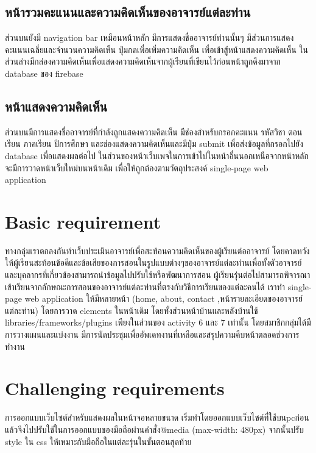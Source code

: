 \documentclass[17pt]{extarticle}
\begin{document}
\subsection{หน้ารวมคะแนนและความคิดเห็นของอาจารย์แต่ละท่าน}

ส่วนบนยังมี navigation bar เหมือนหน้าหลัก มีการแสดงชื่ออาจารย์ท่านนั้นๆ มีส่วนการแสดงคะแนนเฉลี่ยและจำนวนความคิดเห็น ปุ่มกดเพื่อเพิ่มความคิดเห็น เพื่อเข้าสู้หน้าแสดงความคิดเห็น ในส่วนล่างมีกล่องความคิดเห็นเพื่อแสดงความคิดเห็นจากผู้เรียนที่เขียนไว้ก่อนหน้าถูกดึงมาจาก database ของ firebase

\subsection{หน้าแสดงความคิดเห็น}

ส่วนบนมีการแสดงชื่ออาจารย์ที่กำลังถูกแสดงความคิดเห็น มีช่องสำหรับกรอกคะแนน รหัสวิชา ตอนเรียน ภาคเรียน ปีการศึกษา และช่องแสดงความคิดเห็นและมีปุ่ม submit เพื่อส่งข้อมูลที่กรอกไปยัง database เพื่อแสดงผลต่อไป
ในส่วนของหน้าเว็บเพจในการเข้าไปในหน้าอื่นนอกเหนือจากหน้าหลักจะมีการวาดหน้าเว็บใหม่บนหน้าเดิม เพื่อให้ถูกต้องตามวัตถุประสงค์ single-page web application


\pagebreak
\section{Basic requirement}
ทางกลุ่มเราตกลงกันทำเว็บประเมินอาจารย์เพื่อสะท้อนความคิดเห็นของผู้เรียนต่ออาจารย์ โดยคาดหวังให้ผู้เรียนสะท้อนข้อดีและข้อเสียของการสอนในรูปแบบต่างๆของอาจารย์แต่ละท่านเพื่อทั้งตัวอาจารย์และบุคลากรที่เกี่ยวข้องสามารถนำข้อมูลไปปรับใช้หรือพัฒนาการสอน ผู้เรียนรุ่นต่อไปสามารถพิจารณาเข้าเรียนจากลักษณะการสอนของอาจารย์แต่ละท่านที่ตรงกับวิธีการเรียนของแต่ละคนได้ เราทำ single-page web application ให้มีหลายหน้า (home, about, contact ,หน้ารายละเอียดของอาจารย์แต่ละท่าน) โดยการวาด elements ในหน้าเดิม โดยทั้งส่วนหน้าบ้านและหลังบ้านใช้ libraries/frameworks/plugins เพียงในส่วนของ activity 6 และ 7 เท่านั้น โดยสมาชิกกลุ่มได้มีการวางแผนและแบ่งงาน มีการนัดประชุมเพื่ออัพเดทงานที่เหลือและสรุปความคืบหน้าตลอดช่วงการทำงาน
\section{Challenging requirements}

การออกแบบเว็บไซต์สำหรับแสดงผลในหน้าจอหลายขนาด เริ่มทำโดยออกแบบเว็บไซต์ที่ใช้บนpcก่อน แล้วจึงไปปรับใช้ในการออกแบบของมือถือผ่านคำสั่ง@media (max-width: 480px)
จากนั้นปรับ style ใน css ให้เหมาะกับมือถือในแต่ละรุ่นในขั้นตอนสุดท้าย
\end{document}
